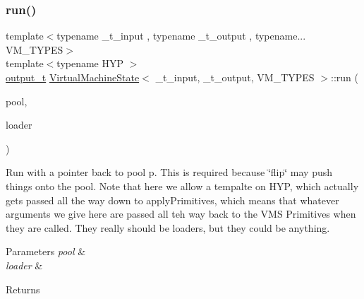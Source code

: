 \subsubsection{\texorpdfstring{run()}{run()}\hspace{0.1cm}{\footnotesize\ttfamily [2/2]}}
{\footnotesize\ttfamily template$<$typename \+\_\+t\+\_\+input , typename \+\_\+t\+\_\+output , typename... V\+M\+\_\+\+T\+Y\+P\+ES$>$ \\
template$<$typename H\+YP $>$ \\
\hyperlink{class_virtual_machine_state_a005a025f97d9505b00e7f9f0e99002bb}{output\+\_\+t} \hyperlink{class_virtual_machine_state}{Virtual\+Machine\+State}$<$ \+\_\+t\+\_\+input, \+\_\+t\+\_\+output, V\+M\+\_\+\+T\+Y\+P\+ES $>$\+::run (\begin{DoxyParamCaption}\item[{\hyperlink{class_virtual_machine_pool}{Virtual\+Machine\+Pool}$<$ \hyperlink{class_virtual_machine_state}{Virtual\+Machine\+State}$<$ \hyperlink{class_virtual_machine_state_a04c5592dddd5b9ffdae5a509d73127dd}{input\+\_\+t}, \hyperlink{class_virtual_machine_state_a005a025f97d9505b00e7f9f0e99002bb}{output\+\_\+t}, V\+M\+\_\+\+T\+Y\+P\+E\+S... $>$$>$ $\ast$}]{pool,  }\item[{H\+YP $\ast$}]{loader }\end{DoxyParamCaption})\hspace{0.3cm}{\ttfamily [inline]}}

Run with a pointer back to pool p. This is required because \char`\"{}flip\char`\"{} may push things onto the pool. Note that here we allow a tempalte on H\+YP, which actually gets passed all the way down to apply\+Primitives, which means that whatever arguments we give here are passed all teh way back to the V\+MS Primitives when they are called. They really should be loaders, but they could be anything. 
\begin{DoxyParams}{Parameters}
{\em pool} & \\
\hline
{\em loader} & \\
\hline
\end{DoxyParams}
\begin{DoxyReturn}{Returns}

\end{DoxyReturn}
\mbox{\label{class_virtual_machine_state_aa44adbacc52d720bff01098c34275d0e}} 
